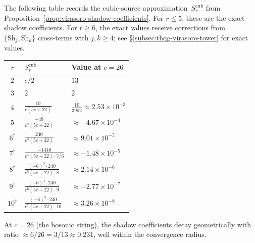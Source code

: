 \begin{computation}
\label{comp:virasoro-shadow-table}

The following table records the cubic-source
approximation~$S_r^{\mathrm{cub}}$ from
Proposition~\ref{prop:virasoro-shadow-coefficients}.
For $r \leq 5$, these are the exact shadow coefficients.
For $r \geq 6$, the exact values receive corrections from
$\{\mathrm{Sh}_j, \mathrm{Sh}_k\}$ cross-terms with
$j,k \geq 4$; see
\S\ref{subsec:thqg-virasoro-tower} for exact values.

\begin{center}
\renewcommand{\arraystretch}{1.5}
\small
\begin{tabular}{cll}
\toprule
$r$ & $S_r^{\mathrm{cub}}$ & Value at $c = 26$ \\
\midrule
$2$ & $c/2$ & $13$ \\
$3$ & $2$ & $2$ \\
$4$ & $\displaystyle\frac{10}{c(5c+22)}$
 & $\displaystyle\frac{10}{3952}
 \approx 2.53 \times 10^{-3}$ \\
$5$ & $\displaystyle\frac{-48}{c^2(5c+22)}$
 & $\approx -4.67 \times 10^{-4}$ \\
$6^{\dagger}$ & $\displaystyle\frac{240}{c^3(5c+22)}$
 & $\approx 9.01 \times 10^{-5}$ \\
$7^{\dagger}$ & $\displaystyle\frac{-1440}{c^4(5c+22) \cdot 7/6}$
 & $\approx -1.48 \times 10^{-5}$ \\
$8^{\dagger}$ & $\displaystyle\frac{(-6)^3 \cdot 240}
 {c^5(5c+22) \cdot 8}$
 & $\approx 2.14 \times 10^{-6}$ \\
$9^{\dagger}$ & $\displaystyle\frac{(-6)^4 \cdot 240}
 {c^6(5c+22) \cdot 9}$
 & $\approx -2.77 \times 10^{-7}$ \\
$10^{\dagger}$ & $\displaystyle\frac{(-6)^5 \cdot 240}
 {c^7(5c+22) \cdot 10}$
 & $\approx 3.26 \times 10^{-8}$ \\
\bottomrule
\end{tabular}
\end{center}


\smallskip
\noindent At $c = 26$ (the bosonic string), the shadow
coefficients decay geometrically with ratio
$\approx 6/26 = 3/13 \approx 0.231$, well within the
convergence radius.
\end{computation}

